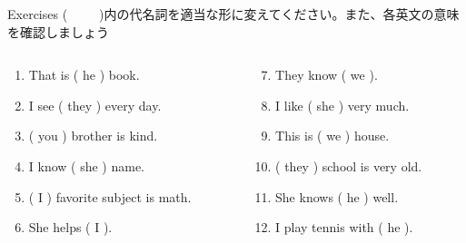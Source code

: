 \documentclass[aspectratio=169,xcolor={dvipsnames,table}]{beamer}
\begin{document}
\begin{frame}[plain]{Exercises}
(~~~~~)内の代名詞を適当な形に変えてください。また、各英文の意味を確認しましょう

\begin{columns}[t]
 \begin{column}{.45\textwidth}
   \begin{enumerate}
  \item That is ( he ) book.\hfill{}
  \item I see ( they ) every day.\hfill{}
  \item ( you ) brother is kind.\hfill{}
  \item I know ( she ) name.\hfill{}
  \item ( I ) favorite subject is math.\hfill{}
  \item She helps ( I ).\hfill{}
 \end{enumerate}
 \end{column}
\begin{column}{.45\textwidth}
  \begin{enumerate}\setcounter{enumi}{6}
  \item They know ( we ).\hfill{}
  \item I like ( she ) very much.\hfill{}
  \item This is ( we ) house.\hfill{}
  \item ( they ) school is very old.\hfill{}
  \item She knows ( he ) well.\hfill{}
  \item I play tennis with ( he ).\hfill{}
 \end{enumerate}
\end{column}
\end{columns}

\end{frame}
\end{document}
